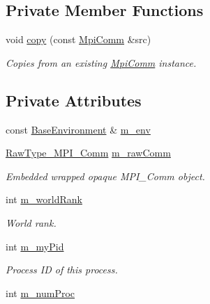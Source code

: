 \subsection*{Private Member Functions}
\begin{DoxyCompactItemize}
\item 
void \hyperlink{class_q_u_e_s_o_1_1_mpi_comm_a62220ff8cea91f4f51e8713a9a513846}{copy} (const \hyperlink{class_q_u_e_s_o_1_1_mpi_comm}{Mpi\-Comm} \&src)
\begin{DoxyCompactList}\small\item\em Copies from an existing \hyperlink{class_q_u_e_s_o_1_1_mpi_comm}{Mpi\-Comm} instance. \end{DoxyCompactList}\end{DoxyCompactItemize}
\subsection*{Private Attributes}
\begin{DoxyCompactItemize}
\item 
const \hyperlink{class_q_u_e_s_o_1_1_base_environment}{Base\-Environment} \& \hyperlink{class_q_u_e_s_o_1_1_mpi_comm_a6b63af09a9b80f14b25409bc561abb41}{m\-\_\-env}
\item 
\hyperlink{namespace_q_u_e_s_o_af48741a7e6d7897e9e96e0f5bb26cfd7}{Raw\-Type\-\_\-\-M\-P\-I\-\_\-\-Comm} \hyperlink{class_q_u_e_s_o_1_1_mpi_comm_a990a22b37217ce6fc6a7c818c8d0106b}{m\-\_\-raw\-Comm}
\begin{DoxyCompactList}\small\item\em Embedded wrapped opaque M\-P\-I\-\_\-\-Comm object. \end{DoxyCompactList}\item 
int \hyperlink{class_q_u_e_s_o_1_1_mpi_comm_aae8c456bc75534d43d682178bf98ef65}{m\-\_\-world\-Rank}
\begin{DoxyCompactList}\small\item\em World rank. \end{DoxyCompactList}\item 
int \hyperlink{class_q_u_e_s_o_1_1_mpi_comm_aca028ecbe31a1eafa0e0bf93b331bcb9}{m\-\_\-my\-Pid}
\begin{DoxyCompactList}\small\item\em Process I\-D of this process. \end{DoxyCompactList}\item 
int \hyperlink{class_q_u_e_s_o_1_1_mpi_comm_a73c6f34523215042d866680b3e9a1497}{m\-\_\-num\-Proc}
\end{DoxyCompactItemize}


